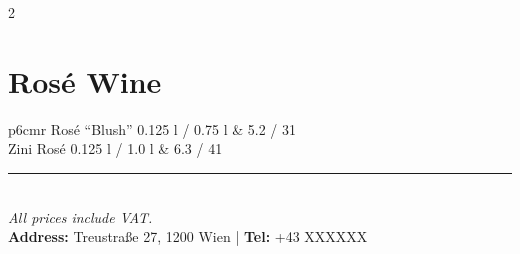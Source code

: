 \documentclass[a4paper,12pt]{article}
\begin{document}
\begin{multicols}{2}
\section*{Rosé Wine}
\begin{tabular}{p{6cm}r}
Rosé “Blush” 0.125 l / 0.75 l & 5.2 / 31\\
Zini Rosé 0.125 l / 1.0 l & 6.3 / 41
\end{tabular}

\end{multicols}

\vfill
\begin{center}
    \rule{0.5\linewidth}{0.4pt}\\
    {\small \textit{All prices include VAT.}}\\
    {\small \textbf{Address:} Treustraße 27, 1200 Wien \quad | \quad \textbf{Tel:} +43 XXXXXX }
\end{center}
\end{document}
